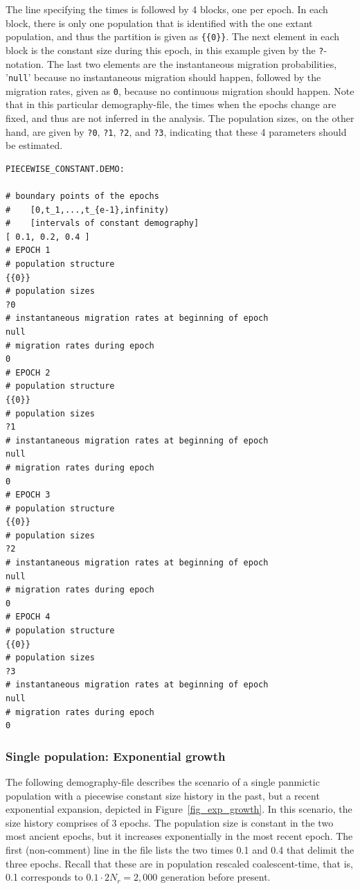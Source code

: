 \documentclass{article}
\numberwithin{equation}{section}
\begin{document}
The line specifying the times is followed by 4 blocks, one per epoch. In each block, there is only one population that is identified with the one extant population, and thus the partition is given as \texttt{\{\{0\}\}}. The next element in each block is the constant size during this epoch, in this example given by the \texttt{?}-notation. The last two elements are the instantaneous migration probabilities, '\texttt{null}' because no instantaneous migration should happen, followed by the migration rates, given as \texttt{0}, because no continuous migration should happen. Note that in this particular demography-file, the times when the epochs change are fixed, and thus are not inferred in the analysis. The population sizes, on the other hand, are given by \texttt{?0}, \texttt{?1}, \texttt{?2}, and \texttt{?3}, indicating that these 4 parameters should be estimated.

\begin{verbatim}
PIECEWISE_CONSTANT.DEMO:

# boundary points of the epochs
#    [0,t_1,...,t_{e-1},infinity)
#    [intervals of constant demography]
[ 0.1, 0.2, 0.4 ]
# EPOCH 1
# population structure
{{0}}
# population sizes
?0
# instantaneous migration rates at beginning of epoch
null
# migration rates during epoch
0
# EPOCH 2
# population structure
{{0}}
# population sizes
?1
# instantaneous migration rates at beginning of epoch
null
# migration rates during epoch
0
# EPOCH 3
# population structure
{{0}}
# population sizes
?2
# instantaneous migration rates at beginning of epoch
null
# migration rates during epoch
0
# EPOCH 4
# population structure
{{0}}
# population sizes
?3
# instantaneous migration rates at beginning of epoch
null
# migration rates during epoch
0
\end{verbatim}

\subsubsection{Single population: Exponential growth}
\label{sec_demo_exp_growth}


The following demography-file describes the scenario of a single panmictic population with a piecewise constant size history in the past, but a recent exponential expansion, depicted in Figure~\ref{fig_exp_growth}. In this scenario, the size history comprises of 3 epochs. The population size is constant in the two most ancient epochs, but it increases exponentially in the most recent epoch. The first (non-comment) line in the file lists the two times 0.1 and 0.4 that delimit the three epochs. Recall that these are in population rescaled coalescent-time, that is, 0.1 corresponds to $0.1 \cdot 2 N_r = 2,000$ generation before present.
\end{document}
